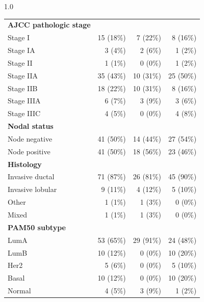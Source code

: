 \documentclass[11pt,a4paper]{article}
\begin{document}
\begin{spacing}{1.0}
\begin{longtable}{@{}p{}rrr@{}}
\textbf{AJCC pathologic stage} &  &  &  \\
\quad Stage I & 15 (18\%) & 7 (22\%) & 8 (16\%) \\
\quad Stage IA & 3 (4\%) & 2 (6\%) & 1 (2\%) \\
\quad Stage II & 1 (1\%) & 0 (0\%) & 1 (2\%) \\
\quad Stage IIA & 35 (43\%) & 10 (31\%) & 25 (50\%) \\
\quad Stage IIB & 18 (22\%) & 10 (31\%) & 8 (16\%) \\
\quad Stage IIIA & 6 (7\%) & 3 (9\%) & 3 (6\%) \\
\quad Stage IIIC & 4 (5\%) & 0 (0\%) & 4 (8\%) \\
\textbf{Nodal status} &  &  &  \\
\quad Node negative & 41 (50\%) & 14 (44\%) & 27 (54\%) \\
\quad Node positive & 41 (50\%) & 18 (56\%) & 23 (46\%) \\
\textbf{Histology} &  &  &  \\
\quad Invasive ductal & 71 (87\%) & 26 (81\%) & 45 (90\%) \\
\quad Invasive lobular & 9 (11\%) & 4 (12\%) & 5 (10\%) \\
\quad Other & 1 (1\%) & 1 (3\%) & 0 (0\%) \\
\quad Mixed & 1 (1\%) & 1 (3\%) & 0 (0\%) \\
\textbf{PAM50 subtype} &  &  &  \\
\quad LumA & 53 (65\%) & 29 (91\%) & 24 (48\%) \\
\quad LumB & 10 (12\%) & 0 (0\%) & 10 (20\%) \\
\quad Her2 & 5 (6\%) & 0 (0\%) & 5 (10\%) \\
\quad Basal & 10 (12\%) & 0 (0\%) & 10 (20\%) \\
\quad Normal & 4 (5\%) & 3 (9\%) & 1 (2\%) \\
\bottomrule
\end{longtable}
\normalsize


\end{spacing}
\end{document}
